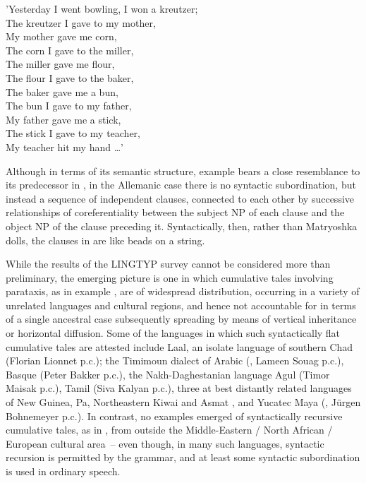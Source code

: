 \documentclass[output=paper,colorlinks,citecolor=brown
]{langscibook}
\begin{document}
'Yesterday I went bowling, I won a kreutzer;\\
The kreutzer I gave to my mother, \\
My mother gave me corn, \\
The corn I gave to the miller, \\
The miller gave me flour, \\
The flour I gave to the baker, \\
The baker gave me a bun, \\
The bun I gave to my father, \\
My father gave me a stick, \\
The stick I gave to my teacher, \\
My teacher hit my hand  \ldots ' \\

\z

Although in terms of its semantic structure, example  bears a close resemblance to its predecessor in , in the Allemanic case there is no syntactic subordination, but instead a sequence of independent clauses, connected to each other by successive relationships of coreferentiality between the subject NP of each clause and the object NP of the clause preceding it.  Syntactically, then, rather than Matryoshka dolls, the clauses in  are like beads on a string.

While the results of the LINGTYP survey cannot be considered more than preliminary, the emerging picture is one in which cumulative tales involving parataxis, as in example , are of widespread distribution, occurring in a variety of unrelated languages and cultural regions, and hence not accountable for in terms of a single ancestral case subsequently spreading by means of vertical inheritance or horizontal diffusion.  Some of the languages in which such syntactically flat cumulative tales are attested include Laal, an isolate language of southern Chad (Florian Lionnet p.c.); the Timimoun dialect of Arabic (\cite{mammeri1985ahellil}, Lameen Souag p.c.), Basque (Peter Bakker p.c.), the Nakh-Daghestanian language Agul (Timor Maisak p.c.), Tamil (Siva Kalyan p.c.), three at best distantly related languages of New Guinea, Pa, Northeastern Kiwai and Asmat \citep{voorhoeve2010remarkable}, and Yucatec Maya (\cite[180--186]{smailus1975textos}, Jürgen Bohnemeyer p.c.).  In contrast, no examples emerged of syntactically recursive cumulative tales, as in , from outside the Middle-Eastern / North African / European cultural area~– even though, in many such languages, syntactic recursion is permitted by the grammar, and at least some syntactic subordination is used in ordinary speech.  
\end{document}
